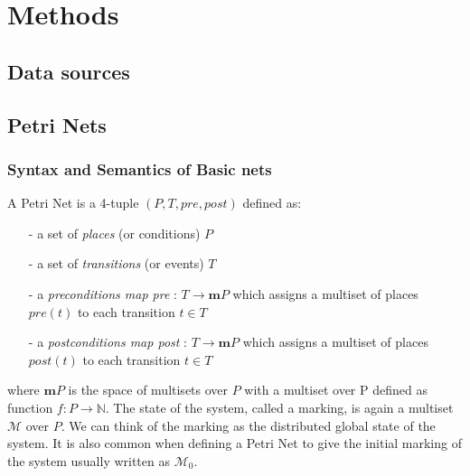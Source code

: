 
\chapter{Methods}
\label{chap:methods}
\ifpdf
    \graphicspath{{Chapter2/Figs/Raster/}{Chapter2/Figs/PDF/}{Chapter2/Figs/}}
\else
    \graphicspath{{Chapter2/Figs/Vector/}{Chapter2/Figs/}}
\fi

\section{Data sources}

\section{Petri Nets}
\subsection{Syntax and Semantics of Basic nets}
A Petri Net is a 4-tuple $(P, T, pre, post)$ defined as:
\begin{itemize}
\item[-] a set of \textit{places} (or conditions) $P$
\item[-] a set of \textit{transitions} (or events) $T$
\item[-] a \textit{preconditions map pre} : $T \rightarrow \mathbf{m}P$ which assigns a multiset of places $pre(t)$ to each transition $t \in T$
\item[-] a \textit{postconditions map post} : $T \rightarrow \mathbf{m}P$ which assigns a multiset of places $post(t)$ to each transition $t \in T$
\end{itemize}
where $\mathbf{m}P$ is the space of multisets over $P$ with a multiset over P defined as function $f: P \rightarrow \mathbb{N}$. The state of the system, called a marking, is again a multiset $\mathcal{M}$ over $P$. We can think of the marking as the distributed global state of the system. It is also common when defining a Petri Net to give the initial marking of the system usually written as $\mathcal{M}_0$.

